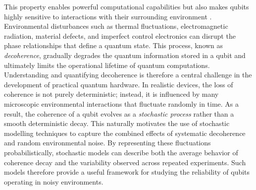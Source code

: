 \documentclass[
	a4paper, %
	10pt, %
	unnumberedsections, %
	twoside, %
]{LTJournalArticle}
\begin{document}
This property enables powerful computational capabilities but also makes qubits highly sensitive to interactions with their surrounding environment \autocite{article2}. Environmental disturbances such as thermal fluctuations, electromagnetic radiation, material defects, and imperfect control electronics can disrupt the phase relationships that define a quantum state. This process, known as \textit{decoherence}, gradually degrades the quantum information stored in a qubit and ultimately limits the operational lifetime of quantum computations\autocite{tepanyan2025decoherence}. Understanding and quantifying decoherence is therefore a central challenge in the development of practical quantum hardware. In realistic devices, the loss of coherence is not purely deterministic; instead, it is influenced by many microscopic environmental interactions that fluctuate randomly in time. As a result, the coherence of a qubit evolves as a \textit{stochastic process} \autocite{wellard2001stochasticnoisesourcedecoherence} rather than a smooth deterministic decay. This naturally motivates the use of stochastic modelling techniques to capture the combined effects of systematic decoherence and random environmental noise. By representing these fluctuations probabilistically, stochastic models can describe both the average behavior of coherence decay and the variability observed across repeated experiments. Such models therefore provide a useful framework for studying the reliability of qubits operating in noisy environments.
\end{document}
